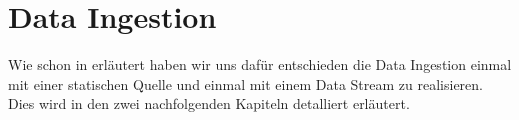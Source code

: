 \section{Data Ingestion}

Wie schon in  erläutert haben wir uns dafür entschieden die Data Ingestion einmal mit einer statischen Quelle und einmal
mit einem Data Stream zu realisieren.
Dies wird in den zwei nachfolgenden Kapiteln detalliert erläutert.



